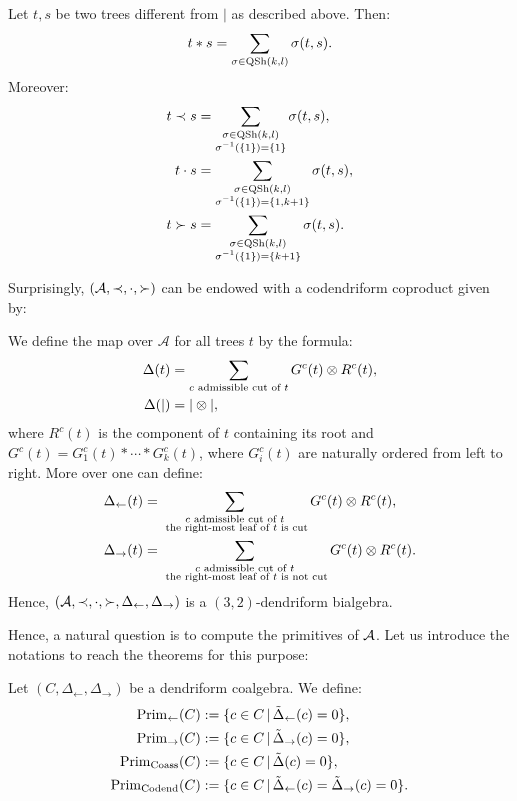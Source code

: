  \begin{thm}\label{thm:produit}
 	Let $t,s$ be two trees different from $|$ as described above. Then: 
 	\[
 	t*s=\sum_{\sigma\in \operatorname{QSh}(k,l)}\sigma(t,s).
 	\]
 	Moreover:
 		\begin{align*}
 		t\prec s&=\sum_{\substack{\sigma\in\operatorname{QSh}(k,l) \\ \sigma^{-1}(\{1\})=\{1\}}} \sigma(t,s), \\
 		t\cdot s&=\sum_{\substack{\sigma\in\operatorname{QSh}(k,l) \\ \sigma^{-1}(\{1\})=\{1,k+1\}}} \sigma(t,s), \\
 		t\succ s&=\sum_{\substack{\sigma\in\operatorname{QSh}(k,l) \\ \sigma^{-1}(\{1\})=\{k+1\}}} \sigma(t,s).
 	\end{align*}
 \end{thm}
 Surprisingly,  $(\operatorname{\mathcal{A}},\prec,\cdot,\succ)$ can be endowed with a codendriform coproduct given by:
 
 \begin{thm}\label{thm:coproduit}
 	We define the map over $\mathcal{A}$ for all trees $t$ by the formula:
 	\begin{align*}
 		\Delta(t)&=\sum_{c \text{ \normalfont admissible cut of }t} G^c(t)\otimes R^c(t), \\
 		\Delta(|)&=|\otimes |,
 	\end{align*}
 	where $R^c(t)$ is the component of $t$ containing its root and $G^c(t)=G^c_1(t)*\cdots *G^c_k(t)$, where $G^c_i(t)$ are naturally ordered from left to right. More over one can define:
 	\begin{align*}
 		\Delta_{\leftarrow}(t)&=\sum_{\substack{c \text{ \normalfont admissible cut of }t \\ \text{ \normalfont the right-most leaf of $t$ is cut}}} G^c(t)\otimes R^c(t), \\
 		\Delta_{\rightarrow}(t)&=\sum_{\substack{c \text{ \normalfont admissible cut of }t \\ \text{ \normalfont the right-most leaf of $t$ is not cut}}} G^c(t)\otimes R^c(t).
 	\end{align*}
 Hence, $(\operatorname{\mathcal{A}},\prec,\cdot,\succ,\Delta_{\leftarrow},\Delta_{\rightarrow})$ is a $(3,2)$-dendriform bialgebra.
 \end{thm}

Hence, a natural question is to compute the primitives of $\operatorname{\mathcal{A}}$. Let us introduce the notations to reach the theorems for this purpose:
\begin{defi}
	Let $(C,\Delta_{\leftarrow},\Delta_{\rightarrow})$ be a dendriform coalgebra. We define:
	\begin{align*}
		\operatorname{Prim}_{\leftarrow}(C)&:=\{ c\in C \,|\, \tilde{\Delta}_{\leftarrow}(c)=0 \}, \\
		\operatorname{Prim}_{\rightarrow}(C)&:=\{ c\in C \,|\, \tilde{\Delta}_{\rightarrow}(c)=0 \}, \\
		\operatorname{Prim}_{\operatorname{Coass}}(C)&:=\{ c\in C \,|\, \tilde{\Delta}(c)=0 \},\\
		\operatorname{Prim}_{\operatorname{Codend}}(C)&:=\{ c\in C \,|\, \tilde{\Delta}_{\leftarrow}(c)=\tilde{\Delta}_{\rightarrow}(c)=0 \}.
	\end{align*}
\end{defi}

